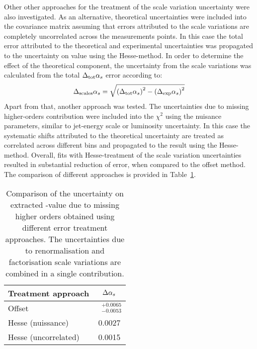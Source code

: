 Other other approaches for the treatment of the scale variation uncertainty were also investigated. As an alternative, theoretical uncertainties were included into the covariance matrix assuming that errors attributed to the scale variations are completely uncorrelated across the measurements points. In this case the total error attributed to the theoretical and experimental uncertainties was propagated to the uncertainty on \asz value using the Hesse-method. In order to determine the effect of the theoretical component, the uncertainty from the scale variations was calculated from the total $\Delta_\text{tot}\mbox{$\alpha_{s}$}$ error according to:
\begin{equation}
 \Delta_\text{scales}\mbox{$\alpha_{s}$} = \sqrt{\left(\Delta_\text{tot}\mbox{$\alpha_{s}$}\right)^2 - \left(\Delta_\text{exp}\mbox{$\alpha_{s}$}\right)^2}
\end{equation}
Apart from that, another approach was tested. The uncertainties due to missing higher-orders contribution were included into the $\chi^2$ using the nuisance parameters, similar to jet-energy scale or luminosity uncertainty. In this case the systematic shifts attributed to the theoretical uncertainty are treated as correlated across different bins and propagated to the result using the Hesse-method. Overall, fits with Hesse-treatment of the scale variation uncertainties resulted in substantial reduction of \asz error, when compared to the offset method. The comparison of different approaches is provided in Table~\ref{tab:scaleuncvariants}.
\begin{table}[h]
\centering
\begin{tabular}{|l|c|}
 \hline
 Treatment approach & $\Delta\mbox{$\alpha_{s}$}$ \\
 \hline
 \hline
  Offset & $\phantom{x}^{+0.0065}_{-0.0053}$\\
  Hesse (nuissance) & 0.0027 \\
  Hesse (uncorrelated) & 0.0015 \\
 \hline
\end{tabular}
\caption{Comparison of the uncertainty on extracted \asz-value due to missing higher orders obtained using different error treatment approaches. The uncertainties due to renormalisation and factorisation scale variations are combined in a single contribution.}
\label{tab:scaleuncvariants}
\end{table}

